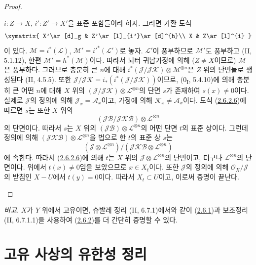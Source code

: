 \begin{proof}
\begin{env}[2.6.2.5]
$i:Z\to X$, $i':Z'\to X'$을 표준 포함들이라 하자. 그러면 가환 도식
\[
\xymatrix{
X'\ar[d]_g & Z'\ar[l]_{i'}\ar[d]^{h}\\
X & Z\ar[l]^{i}
}
\]
이 있다. $\mathcal M=i^*(\mathcal L)$,
$\mathcal M'=i'^*(\mathcal L')$로 놓자. $\mathcal L'$이 풍부하므로
$\mathcal M'$도 풍부하고 (II, 5.1.12), 한편
$\mathcal M'=h^*(\mathcal M)$이다. 따라서 뇌터 귀납가정에 의해
($Z\neq X$이므로) $\mathcal M$은 풍부하다. 그러므로 충분히 큰
$n$에 대해
$i^*(\mathcal J/\mathcal J\mathcal K)\otimes\mathcal M^{\otimes n}$은
$Z$ 위의 단면들로 생성된다 (II, 4.5.5). 또한
$\mathcal J/\mathcal J\mathcal K
=i_*(i^*(\mathcal J/\mathcal J\mathcal K))$이므로,
(0\textsubscript{I}, 5.4.10)에 의해 충분히 큰 어떤 $n$에 대해
$X$ 위의
$(\mathcal J/\mathcal J\mathcal K)\otimes\mathcal L^{\otimes n}$의
단면 $s$가 존재하여 $s(x)\neq0$이다. 실제로 $\mathcal J$의 정의에
의해 $\mathcal J_x=\mathcal A_x$이고, 가정에 의해
$\mathcal K_x\neq\mathcal A_x$이다. 도식
(\hyperref[III.2.6.2.6-fr]{2.6.2.6})에 따르면 $s$는 또한 $X$ 위의
\[
(\mathcal J\mathcal B/\mathcal J\mathcal K\mathcal B)
\otimes\mathcal L^{\otimes n}
\]
의 단면이다. 따라서 $s$는 $X$ 위의
$(\mathcal J\mathcal B)\otimes\mathcal L^{\otimes n}$의 어떤 단면
$t$의 표준 상이다. 그런데 정의에 의해
$(\mathcal J\mathcal K\mathcal B)\otimes\mathcal L^{\otimes n}$을
법으로 한 $t$의 표준 상 $s$는
\[
(\mathcal J\otimes\mathcal L^{\otimes n})/
(\mathcal J\mathcal K\mathcal B\otimes\mathcal L^{\otimes n})
\]
에 속한다. 따라서 (\hyperref[III.2.6.2.6-fr]{2.6.2.6})에 의해
$t$는 $X$ 위의 $\mathcal J\otimes\mathcal L^{\otimes n}$의 단면이고,
더구나 $\mathcal L^{\otimes n}$의 단면이다. 위에서 $t(x)\neq0$임을
보았으므로 $x\in X_t$이다. 또한 $\mathcal J$의 정의에 의해
$\mathcal O_X/\mathcal J$의 받침인 $X-U$에서 $t(y)=0$이다. 따라서
$X_t\subset U$이고, 이로써 증명이 끝난다.
\end{env}
\end{proof}

\begin{env}[2.6.3]
\label{III.2.6.3-fr}
\emph{비고.} $X$가 $Y$ 위에서 고유이면, 슈발레 정리 (II, 6.7.1)에서와
같이 (\hyperref[III.2.6.1-fr]{2.6.1})과 보조정리 (II, 6.7.1.1)을
사용하여 (\hyperref[III.2.6.2-fr]{2.6.2})를 더 간단히 증명할 수 있다.
\end{env}

\section{고유 사상의 유한성 정리}
\label{section:III.3-fr}

